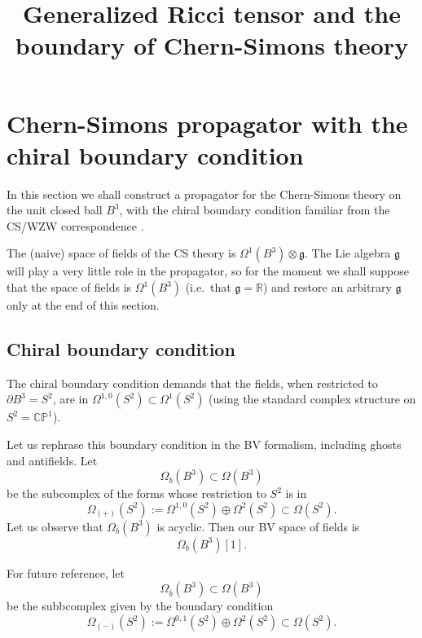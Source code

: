 \documentclass[a4paper]{amsart}
\title{Generalized Ricci tensor and the boundary of Chern-Simons theory}
\theoremstyle{plain}
\theoremstyle{definition}
\newcommand{\g}{\mathfrak{g}}
\newcommand{\R}{\mathbb{R}}
\newcommand{\CP}{\mathbb{CP}^1}
\begin{document}
\maketitle

\section{Chern-Simons propagator with the chiral boundary condition}

In this section we shall construct a propagator for the Chern-Simons theory on the unit closed ball $B^3$, with the chiral boundary condition familiar from the CS/WZW correspondence \cite{W}.

The (naive) space of fields of the CS theory is $\Omega^1(B^3)\otimes\g$. The Lie algebra $\g$ will play a very little role in the propagator, so for the moment we shall suppose that the space of fields is $\Omega^1(B^3)$ (i.e.\ that $\g=\R$) and restore an arbitrary $\g$ only at the  end of this section.

\subsection{Chiral boundary condition}
The chiral boundary condition demands that the fields, when restricted to $\partial B^3 = S^2$, are in $\Omega^{1,0}(S^2)\subset\Omega^1(S^2)$ (using the standard complex structure on $S^2=\CP$). 

Let us rephrase this boundary condition in the BV formalism, including ghosts and antifields. Let 
$$\Omega_b(B^3)\subset\Omega(B^3)$$
be the subcomplex of the forms whose restriction to $S^2$ is in
$$\Omega_{(+)}(S^2):=\Omega^{1,0}(S^2)\oplus\Omega^2(S^2)\subset\Omega(S^2).$$
Let us observe that $\Omega_b(B^3)$ is acyclic.
Then our BV space of fields is
$$\Omega_b(B^3)[1].$$


For future reference, let 
$$\Omega_{\bar b}(B^3)\subset\Omega(B^3)$$
be the subbcomplex given by the boundary condition
$$\Omega_{(-)}(S^2):=\Omega^{0,1}(S^2)\oplus\Omega^2(S^2)\subset\Omega(S^2).$$
\end{document}
